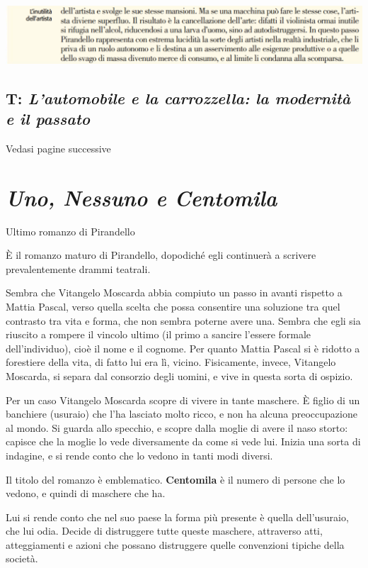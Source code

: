 \documentclass[a4paper, twoside, titlepage]{book}
\begin{document}
\begin{center}
\includegraphics[width=\textwidth]{macchina6}
\end{center}
\vfill
\section{T: \textit{L'automobile e la carrozzella: la modernità e il passato}}

Vedasi pagine successive






\chapter{\textit{Uno, Nessuno e Centomila}}

Ultimo romanzo di Pirandello

È il romanzo maturo di Pirandello, dopodiché egli continuerà a scrivere prevalentemente drammi teatrali.

Sembra che Vitangelo Moscarda abbia compiuto un passo in avanti rispetto a Mattia Pascal, verso quella scelta che possa consentire una soluzione tra quel contrasto tra vita e forma, che non sembra poterne avere una.
Sembra che egli sia riuscito a rompere il vincolo ultimo (il primo a sancire l’essere formale dell’individuo), cioè il nome e il cognome.
Per quanto Mattia Pascal si è ridotto a forestiere della vita, di fatto lui era lì, vicino.
Fisicamente, invece, Vitangelo Moscarda, si separa dal consorzio degli uomini, e vive in questa sorta di ospizio.

Per un caso Vitangelo Moscarda scopre di vivere in tante maschere. È figlio di un banchiere (usuraio) che l’ha lasciato molto ricco, e non ha alcuna preoccupazione al mondo.
Si guarda allo specchio, e scopre dalla moglie di avere il naso storto: capisce che la moglie lo vede diversamente da come si vede lui.
Inizia una sorta di indagine, e si rende conto che lo vedono in tanti modi diversi.

Il titolo del romanzo è emblematico. \textbf{Centomila} è il numero di persone che lo vedono, e quindi di maschere che ha.

Lui si rende conto che nel suo paese la forma più presente è quella dell’usuraio, che lui odia.
Decide di distruggere tutte queste maschere, attraverso atti, atteggiamenti e azioni che possano distruggere quelle convenzioni tipiche della società.
\end{document}
